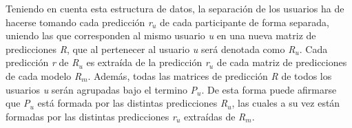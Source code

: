 Teniendo en cuenta esta estructura de datos, la separación de los usuarios ha de hacerse tomando cada predicción \textit{r$_{u}$} de cada participante de forma separada, uniendo las que corresponden al mismo usuario \textit{u} en una nueva matriz de predicciones \textit{R}, que al pertenecer al usuario \textit{u} será denotada como \textit{R$_{u}$}. Cada predicción \textit{r} de \textit{R$_{u}$} es extraída de la predicción \textit{r$_{u}$} de cada matriz de predicciones de cada modelo \textit{R$_{m}$}. Además, todas las matrices de predicción \textit{R} de todos los usuarios \textit{u} serán agrupadas bajo el termino \textit{P$_{u}$}. De esta forma puede afirmarse que \textit{P$_{u}$} está formada por las distintas predicciones \textit{R$_{u}$}, las cuales a su vez están formadas por las distintas predicciones \textit{r$_{u}$} extraídas de \textit{R$_{m}$}.
